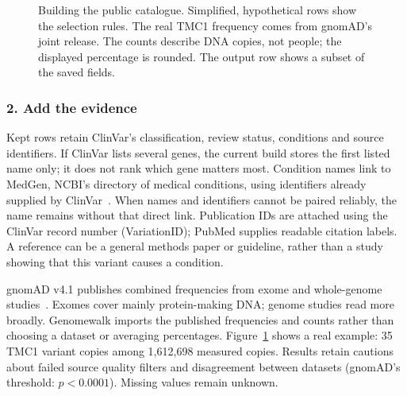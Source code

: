 \documentclass[10pt,twocolumn,letterpaper]{article}
\begin{document}
\begin{figure}[t]
\caption{Building the public catalogue. Simplified, hypothetical rows show the selection rules. The real TMC1 frequency comes from gnomAD's joint release. The counts describe DNA copies, not people; the displayed percentage is rounded. The output row shows a subset of the saved fields.}
\label{fig:offline-build}
\end{figure}

\subsubsection*{2. Add the evidence}
Kept rows retain ClinVar's classification, review status, conditions and source identifiers. If ClinVar lists several genes, the current build stores the first listed name only; it does not rank which gene matters most. Condition names link to MedGen, NCBI's directory of medical conditions, using identifiers already supplied by ClinVar~\cite{medgen}. When names and identifiers cannot be paired reliably, the name remains without that direct link. Publication IDs are attached using the ClinVar record number (VariationID); PubMed supplies readable citation labels. A reference can be a general methods paper or guideline, rather than a study showing that this variant causes a condition.

gnomAD v4.1 publishes combined frequencies from exome and whole-genome studies~\cite{gnomad}. Exomes cover mainly protein-making DNA; genome studies read more broadly. Genomewalk imports the published frequencies and counts rather than choosing a dataset or averaging percentages. Figure~\ref{fig:offline-build} shows a real example: 35 TMC1 variant copies among 1,612,698 measured copies. Results retain cautions about failed source quality filters and disagreement between datasets (gnomAD's threshold: $p<0.0001$). Missing values remain unknown.
\end{document}
